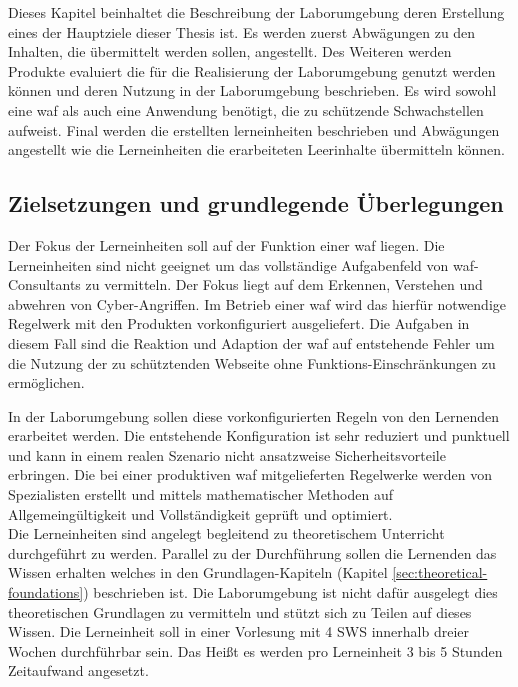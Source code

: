 Dieses Kapitel beinhaltet die Beschreibung der Laborumgebung deren Erstellung eines der Hauptziele dieser Thesis ist.
Es werden zuerst Abwägungen zu den Inhalten, die übermittelt werden sollen, angestellt.
Des Weiteren werden Produkte evaluiert die für die Realisierung der Laborumgebung genutzt werden können und deren Nutzung in der Laborumgebung beschrieben.
Es wird sowohl eine \ac{waf} als auch eine Anwendung benötigt, die zu schützende Schwachstellen aufweist.
Final werden die erstellten lerneinheiten beschrieben und Abwägungen angestellt wie die Lerneinheiten die erarbeiteten Leerinhalte übermitteln können.

\subsection{Zielsetzungen und grundlegende Überlegungen}
\label{sec:learnings-metha}

Der Fokus der Lerneinheiten soll auf der Funktion einer \ac{waf} liegen.
Die Lerneinheiten sind nicht geeignet um das vollständige Aufgabenfeld  von \ac{waf}-Consultants zu vermitteln.
Der Fokus liegt auf dem Erkennen, Verstehen und abwehren von Cyber-Angriffen.
Im Betrieb einer \ac{waf} wird das hierfür notwendige Regelwerk mit den Produkten vorkonfiguriert ausgeliefert.
Die Aufgaben in diesem Fall sind die Reaktion und Adaption der \ac{waf} auf entstehende Fehler um die Nutzung der zu schütztenden Webseite ohne Funktions-Einschränkungen zu ermöglichen.

In der Laborumgebung sollen diese vorkonfigurierten Regeln von den Lernenden erarbeitet werden.
Die entstehende Konfiguration ist sehr reduziert und punktuell und kann in einem realen Szenario nicht ansatzweise Sicherheitsvorteile erbringen.
Die bei einer produktiven \ac{waf} mitgelieferten Regelwerke werden von Spezialisten erstellt und mittels mathematischer Methoden auf Allgemeingültigkeit und Vollständigkeit geprüft und optimiert. \\

Die Lerneinheiten sind angelegt begleitend zu theoretischem Unterricht durchgeführt zu werden.
Parallel zu der Durchführung sollen die Lernenden das Wissen erhalten welches in den Grundlagen-Kapiteln (Kapitel \ref{sec:theoretical-foundations}) beschrieben ist.
Die Laborumgebung ist nicht dafür ausgelegt dies theoretischen Grundlagen zu vermitteln und stützt sich zu Teilen auf dieses Wissen.
Die Lerneinheit soll in einer Vorlesung mit 4 SWS innerhalb dreier Wochen durchführbar sein.
Das Heißt es werden pro Lerneinheit 3 bis 5 Stunden Zeitaufwand angesetzt.


